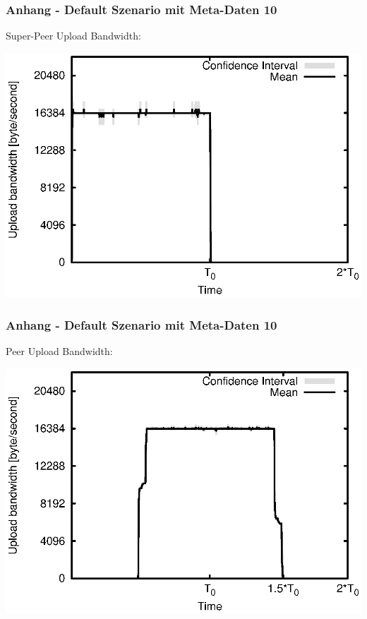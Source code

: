 \begin{frame}
  \frametitle{Anhang - Default Szenario mit Meta-Daten 10}
  Super-Peer Upload Bandwidth:
  
  \begin{center}
    \includegraphics[width=1\textwidth]{fig/plots/scenario_10_meta_data_10/plots/GeneratedMeanCurrentSuperSeederUploadBandwidth.csv.eps}
  \end{center}
\end{frame}


\begin{frame}
  \frametitle{Anhang - Default Szenario mit Meta-Daten 10}
  Peer Upload Bandwidth:
  
  \begin{center}
    \includegraphics[width=1\textwidth]{fig/plots/scenario_10_meta_data_10/plots/GeneratedMeanCurrentUploadBandwidth.csv.eps}
  \end{center}
\end{frame}


